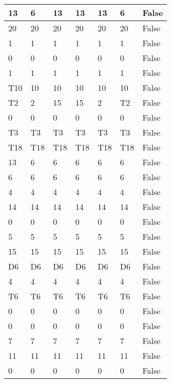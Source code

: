 \begin{longtable}[htbp]{| p{} | p{} | p{}| p{}| p{}| p{}| p{}|}
13 & 6 & 13 & 13 & 13 & 6 & False \\ \hline
20 & 20 & 20 & 20 & 20 & 20 & False \\ \hline
1 & 1 & 1 & 1 & 1 & 1 & False \\ \hline
0 & 0 & 0 & 0 & 0 & 0 & False \\ \hline
1 & 1 & 1 & 1 & 1 & 1 & False \\ \hline
\multicolumn{1}{|l|}{T10} & 10 & 10 & 10 & 10 & 10 & False \\ \hline
\multicolumn{1}{|l|}{T2} & 2 & 15 & 15 & 2 & \multicolumn{1}{l|}{T2} & False \\ \hline
0 & 0 & 0 & 0 & 0 & 0 & False \\ \hline
\multicolumn{1}{|l|}{T3} & \multicolumn{1}{l|}{T3} & \multicolumn{1}{l|}{T3} & \multicolumn{1}{l|}{T3} & \multicolumn{1}{l|}{T3} & \multicolumn{1}{l|}{T3} & False \\ \hline
\multicolumn{1}{|l|}{T18} & \multicolumn{1}{l|}{T18} & \multicolumn{1}{l|}{T18} & \multicolumn{1}{l|}{T18} & \multicolumn{1}{l|}{T18} & \multicolumn{1}{l|}{T18} & False \\ \hline
13 & 6 & 6 & 6 & 6 & 6 & False \\ \hline
6 & 6 & 6 & 6 & 6 & 6 & False \\ \hline
4 & 4 & 4 & 4 & 4 & 4 & False \\ \hline
14 & 14 & 14 & 14 & 14 & 14 & False \\ \hline
0 & 0 & 0 & 0 & 0 & 0 & False \\ \hline
5 & 5 & 5 & 5 & 5 & 5 & False \\ \hline
15 & 15 & 15 & 15 & 15 & 15 & False \\ \hline
\multicolumn{1}{|l|}{D6} & \multicolumn{1}{l|}{D6} & \multicolumn{1}{l|}{D6} & \multicolumn{1}{l|}{D6} & \multicolumn{1}{l|}{D6} & \multicolumn{1}{l|}{D6} & False \\ \hline
4 & 4 & 4 & 4 & 4 & 4 & False \\ \hline
\multicolumn{1}{|l|}{T6} & \multicolumn{1}{l|}{T6} & \multicolumn{1}{l|}{T6} & \multicolumn{1}{l|}{T6} & \multicolumn{1}{l|}{T6} & \multicolumn{1}{l|}{T6} & False \\ \hline
0 & 0 & 0 & 0 & 0 & 0 & False \\ \hline
0 & 0 & 0 & 0 & 0 & 0 & False \\ \hline
7 & 7 & 7 & 7 & 7 & 7 & False \\ \hline
11 & 11 & 11 & 11 & 11 & 11 & False \\ \hline
0 & 0 & 0 & 0 & 0 & 0 & False \\ \hline

\end{longtable}
